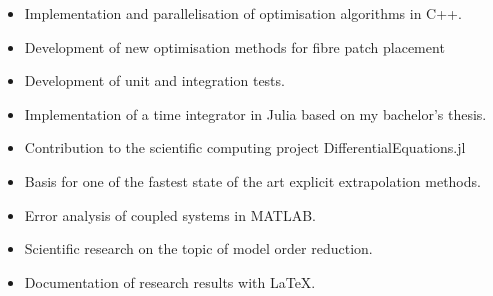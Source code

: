 \quad{}\newline
{}
\begin{itemize}
\item Implementation and parallelisation of optimisation algorithms in C++.
\item Development of new optimisation methods for fibre patch placement
\item Development of unit and integration tests.
\end{itemize}
\quad{}\newline
{}
\begin{itemize}
\item Implementation of a time integrator in Julia based on my bachelor’s thesis.
\item Contribution to the scientific computing project  DifferentialEquations.jl
\item Basis for one of the fastest state of the art explicit extrapolation methods.
\end{itemize}
\quad{}\newline
{}
\begin{itemize}
\item Error analysis of coupled systems in MATLAB.
\item Scientific research on the topic of model order reduction.
\item Documentation of research results with LaTeX.
\end{itemize}
\quad{}\newline